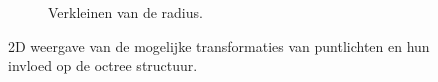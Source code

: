\begin{figure}[t]
\begin{subfigure}[b]{0.3\textwidth}
    \caption{Verkleinen van de radius.}
    \label{fig:dl-transformaties:scale-down}
  \end{subfigure}
  \caption{2D weergave van de mogelijke transformaties van puntlichten en hun invloed op de octree structuur.}
  \label{fig:dl-transformaties}
\end{figure}

